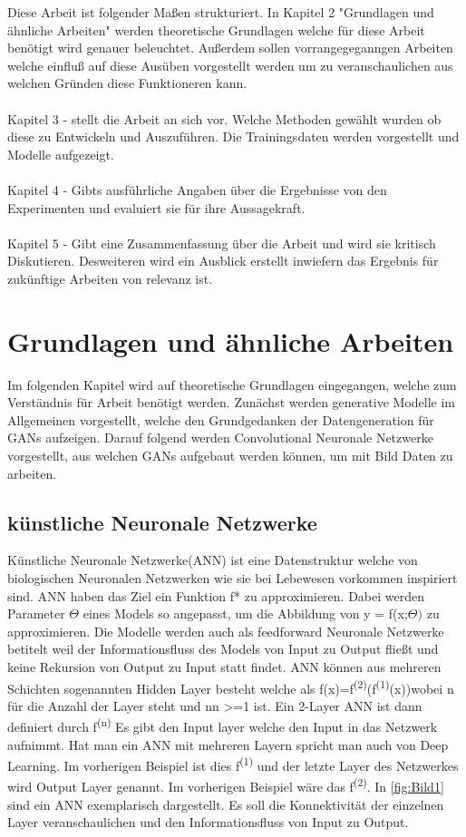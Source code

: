 \documentclass{llncs}
\begin{document}
Diese Arbeit ist folgender Maßen strukturiert. In Kapitel 2 "Grundlagen und ähnliche Arbeiten" werden theoretische Grundlagen welche für diese Arbeit benötigt wird genauer beleuchtet. Außerdem sollen vorrangegeganngen Arbeiten welche einfluß auf diese Ausüben vorgestellt werden um zu veranschaulichen aus welchen Gründen diese Funktioneren kann.
\\\\
Kapitel 3 - stellt die Arbeit an sich vor. Welche Methoden gewählt wurden ob diese zu Entwickeln und Auszuführen. Die Trainingsdaten werden vorgestellt und Modelle aufgezeigt.
\\\\
Kapitel 4 - Gibts  ausführliche Angaben über die Ergebnisse von den Experimenten und evaluiert sie für ihre Aussagekraft.
\\\\
Kapitel 5 - Gibt eine Zusammenfassung über die Arbeit und wird sie kritisch Diskutieren. Desweiteren wird ein Ausblick erstellt inwiefern das Ergebnis für zukünftige Arbeiten von relevanz ist. 

\section{Grundlagen und ähnliche Arbeiten}

Im folgenden Kapitel wird auf theoretische Grundlagen eingegangen, welche zum Verständnis für Arbeit benötigt werden. Zunächst werden  generative Modelle im Allgemeinen vorgestellt, welche den Grundgedanken der Datengeneration für GANs aufzeigen. Darauf folgend werden Convolutional Neuronale Netzwerke vorgestellt, aus welchen GANs aufgebaut werden können, um mit Bild Daten zu arbeiten.

\subsection{künstliche Neuronale Netzwerke}

Künstliche Neuronale Netzwerke(ANN) ist eine Datenstruktur welche von biologischen Neuronalen Netzwerken wie sie bei Lebewesen vorkommen inspiriert sind. ANN haben das Ziel ein Funktion f* zu approximieren. Dabei werden Parameter $\Theta$ eines Models so angepasst, um die Abbildung von y = f(x;$\Theta)$ zu approximieren. Die Modelle werden auch als feedforward Neuronale Netzwerke betitelt weil der Informationsfluss des Models von Input zu Output fließt und keine Rekursion von Output zu Input statt findet. ANN können aus mehreren Schichten sogenannten Hidden Layer besteht welche als f(x)=f\textsuperscript{(2)}(f\textsuperscript{(1)}(x))wobei n für die Anzahl der Layer steht und nn >=1 ist. Ein 2-Layer ANN ist dann definiert durch f\textsuperscript{(n)} Es gibt den Input layer welche den Input in das Netzwerk aufnimmt. Hat man ein ANN mit mehreren Layern spricht man auch von Deep Learning. Im vorherigen Beispiel ist dies f\textsuperscript{(1)} und der letzte Layer des Netzwerkes wird Output Layer genannt. Im vorherigen Beispiel wäre das f\textsuperscript{(2)}\cite{Grundlagen}. In \ref{fig:Bild1} sind ein ANN exemplarisch dargestellt. Es soll die Konnektivität der einzelnen Layer veranschaulichen und den Informationsfluss von Input zu Output. 
\end{document}
